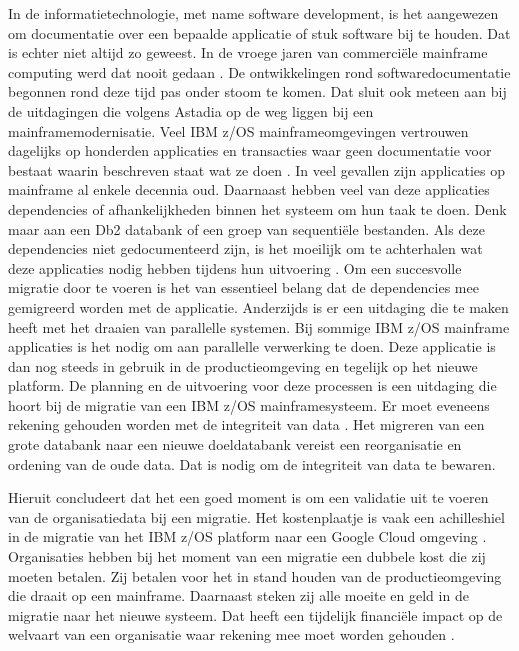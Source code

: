 In de informatietechnologie, met name software development, is het aangewezen om documentatie over een bepaalde applicatie of stuk software bij te houden. Dat is echter niet altijd zo geweest. In de vroege jaren van commerciële mainframe computing werd dat nooit gedaan  \autocite{Zachry2001}. De ontwikkelingen rond softwaredocumentatie begonnen rond deze tijd pas onder stoom te komen. Dat sluit ook meteen aan bij de uitdagingen die volgens Astadia op de weg liggen bij een mainframemodernisatie. Veel IBM z/OS mainframeomgevingen vertrouwen dagelijks op honderden applicaties en transacties waar geen documentatie voor bestaat waarin beschreven staat wat ze doen \autocite{Zachry2001}. In veel gevallen zijn applicaties op mainframe al enkele decennia oud. Daarnaast hebben veel van deze applicaties dependencies of afhankelijkheden binnen het systeem om hun taak te doen. Denk maar aan een Db2 databank of een groep van sequentiële bestanden. Als deze dependencies niet gedocumenteerd zijn, is het moeilijk om te achterhalen wat deze applicaties nodig hebben tijdens hun uitvoering \autocite{Zachry2001}. Om een succesvolle migratie door te voeren is het van essentieel belang dat de dependencies mee gemigreerd worden met de applicatie. Anderzijds is er een uitdaging die te maken heeft met het draaien van parallelle systemen. Bij sommige IBM z/OS mainframe applicaties is het nodig om aan parallelle verwerking te doen. Deze applicatie is dan nog steeds in gebruik in de productieomgeving en tegelijk op het nieuwe platform. De planning en de uitvoering voor deze processen is een uitdaging die hoort bij de migratie van een IBM z/OS mainframesysteem. Er moet eveneens rekening gehouden worden met de integriteit van data \autocite{Astadia2021}. Het migreren van een grote databank naar een nieuwe doeldatabank vereist een reorganisatie en ordening van de oude data. Dat is nodig om de integriteit van data te bewaren. 

Hieruit concludeert \textcite{Astadia2021} dat het een goed moment is om een validatie uit te voeren van de organisatiedata bij een migratie. Het kostenplaatje is vaak een achilleshiel in de migratie van het IBM z/OS platform naar een Google Cloud omgeving \autocite{Astadia2021}. Organisaties hebben bij het moment van een migratie een dubbele kost die zij moeten betalen. Zij betalen voor het in stand houden van de productieomgeving die draait op een mainframe. Daarnaast steken zij alle moeite en geld in de migratie naar het nieuwe systeem. Dat heeft een tijdelijk financiële impact op de welvaart van een organisatie waar rekening mee moet worden gehouden \autocite{Astadia2021}. 

